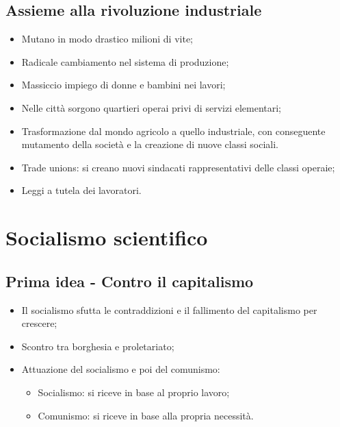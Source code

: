 \documentclass{article}
\begin{document}
\subsection{Assieme alla rivoluzione industriale}
\begin{itemize}
    \item Mutano in modo drastico milioni di vite;
    \item Radicale cambiamento nel sistema di produzione;
    \item Massiccio impiego di donne e bambini nei lavori;
    \item Nelle città sorgono quartieri operai privi di servizi elementari;
    \item Trasformazione dal mondo agricolo a quello industriale, con conseguente mutamento
        della società e la creazione di nuove classi sociali.
    \item Trade unions: si creano nuovi sindacati rappresentativi delle classi operaie;
    \item Leggi a tutela dei lavoratori.
\end{itemize}

\section{Socialismo scientifico}
\subsection{Prima idea - Contro il capitalismo}
\begin{itemize}
    \item Il socialismo sfutta le contraddizioni e il fallimento del capitalismo per crescere;
    \item Scontro tra borghesia e proletariato;
    \item Attuazione del socialismo e poi del comunismo:
        \begin{itemize}
            \item Socialismo: si riceve in base al proprio lavoro;
            \item Comunismo: si riceve in base alla propria necessità.
        \end{itemize}
\end{itemize}
\end{document}

